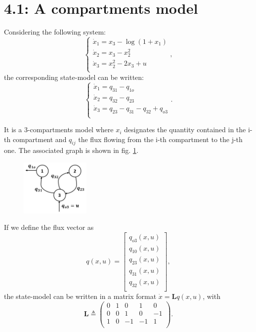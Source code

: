 %
\section*{4.1: A compartments model}

Considering the following system:
\begin{equation}
\left\{
  \begin{array}{l}
  \dot{x}_1=x_3-\log(1+x_1)\\
  \dot{x}_2=x_3-x_2^2\\
  \dot{x}_3=x_2^2-2x_3+u\\
  \end{array} \right.,
\label{eq:system}
\end{equation}
the corresponding state-model can be written:
\begin{equation}
\left\{
  \begin{array}{l}
  \dot{x}_1=q_{31}-q_{1o}\\
  \dot{x}_2=q_{32}-q_{23}\\
  \dot{x}_3=q_{23}-q_{31}-q_{32}+q_{o3}\\
  \end{array} \right..
\label{eq:statemodel}
\end{equation}
 
 It is a 3-compartments model where $x_i$ designates the quantity contained in the i-th compartment and $q_{ij}$ the flux flowing from the i-th compartment to the j-th one. The associated graph is shown in fig. \ref{graphe}.
 
\begin{figure}[h!]
  \centering
  \includegraphics[width=0.3\textwidth]{graphe.JPG}
  \caption{}
  \label{graphe}
\end{figure}
 
 If we define the flux vector as
 \begin{equation}
 q(x,u)=
 \begin{bmatrix}
 q_{o3}(x,u)\\
 q_{10}(x,u)\\
 q_{23}(x,u)\\
 q_{31}(x,u)\\
 q_{32}(x,u)\\
 \end{bmatrix},
\label{eq:fluxvector}
\end{equation}
 the state-model can be written in a matrix format $\dot{x}=\mathbf{L}q(x,u)$, with
 \begin{equation}
 \mathbf{L}\triangleq
 \begin{pmatrix}
 0 & 1 & 0 & 1 & 0\\
 0 & 0 & 1 & 0 & -1\\
 1 & 0 & -1 & -1 & 1\\
 \end{pmatrix} .
\label{eq:L}
\end{equation}

